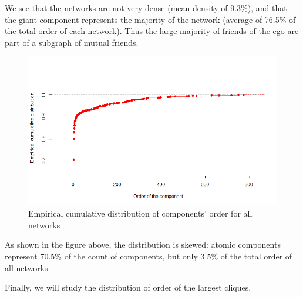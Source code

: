 \documentclass[11pt]{article}       %
\begin{document}
We see that the networks are not very dense (mean density of 9.3\%), and that the giant component represents the majority of the network (average of 76.5\% of the total order of each network). Thus the large majority of friends of the ego are part of a subgraph of mutual friends.

\begin{figure}[H]
\centering
  \includegraphics[width=0.8\linewidth]{componentecdf.png}
    \caption{Empirical cumulative distribution of components' order for all networks}
\end{figure}

As shown in the figure above, the distribution is skewed: atomic components represent 70.5\% of the count of components, but only 3.5\% of the total order of all networks.

\newpage

Finally, we will study the distribution of order of the largest cliques.
\end{document}

